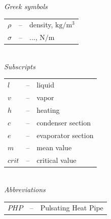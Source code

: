 \documentclass[article]{elsarticle}
\begin{document}
\textit{ Greek symbols}

\begin{tabular}{l c p{10.5cm}}

  $\rho$ & -- & density, $\mathrm{kg/m^3}$ \\
  $\sigma$ & -- & ..., $\mathrm{N/m}$ \\
       
\end{tabular} 
\\ 

\textit{ Subscripts}

\begin{tabular}{l c p{10.5cm}}
 
  $l$ & -- & liquid \\
  $v$ & -- & vapor \\
  $h$ & -- & heating \\
  $c$ & -- & condenser section \\
  $e$ & -- & evaporator section \\
  $m$ & -- & mean value \\
  $crit$ & -- & critical value \\     
\end{tabular} 
\\

\textit{Abbreviations}

\begin{tabular}{l c p{10.5cm}}

  $PHP$ & -- & Pulsating Heat Pipe \\  
       
\end{tabular} 
\end{document}
